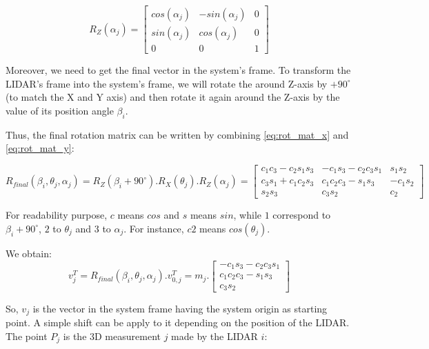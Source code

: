 \documentclass{article}
\newcommand{\vsp}{\vspace{\baselineskip}}
\begin{document}
\begin{equation}
\label{eq:rot_mat_y}
    R_Z(\alpha_j) = 
    \begin{bmatrix}
        cos(\alpha_j) & -sin(\alpha_j) & 0 \\
        sin(\alpha_j) & cos(\alpha_j) & 0 \\
        0 & 0 & 1
    \end{bmatrix}
\end{equation}

Moreover, we need to get the final vector in the system's frame. To transform the LIDAR's frame into the system's frame, we will rotate the around Z-axis by $+90^\circ$ (to match the X and Y axis) and then rotate it again around the Z-axis by the value of its position angle $\beta_i$. 

\vsp

Thus, the final rotation matrix can be written by combining \ref{eq:rot_mat_x} and \ref{eq:rot_mat_y}:

\begin{equation}
    R_{final}(\beta_i,\theta_j,\alpha_j) = 
    R_Z(\beta_i+90^\circ).R_X(\theta_j).R_Z(\alpha_j) =
    \begin{bmatrix}
        c_1c_3 - c_2s_1s_3 & -c_1s_3-c_2c_3s_1 & s_1s_2 \\
        c_3s_1 + c_1c_2s_3 & c_1c_2c_3-s_1s_3 & -c_1s_2 \\
        s_2s_3 & c_3s_2 & c_2
    \end{bmatrix}
\end{equation}

For readability purpose, $c$ means $cos$ and $s$ means $sin$, while $1$ correspond to $\beta_i+90^\circ$, $2$ to $\theta_j$ and $3$ to $\alpha_j$. For instance, $c2$ means $cos(\theta_j)$.

\vsp

We obtain:
\begin{equation}
    v_j^T = R_{final}(\beta_i,\theta_j,\alpha_j).v_{0,j}^T = m_j.
     \begin{bmatrix}
        -c_1s_3-c_2c_3s_1\\
        c_1c_2c_3-s_1s_3 \\
        c_3s_2
    \end{bmatrix}
\end{equation}

So, $v_j$ is the vector in the system frame having the system origin as starting point. A simple shift can be apply to it depending on the position of the LIDAR. The point $P_j$ is the 3D measurement $j$ made by the LIDAR $i$:
\end{document}
